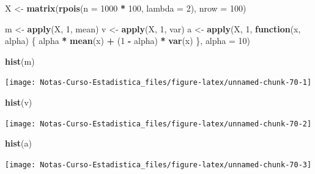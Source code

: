 \documentclass[
  12pt,
]{book}
\newenvironment{Shaded}{\begin{snugshade}}{\end{snugshade}}
\newcommand{\ControlFlowTok}[1]{\textcolor[rgb]{0.13,0.29,0.53}{\textbf{#1}}}
\newcommand{\DataTypeTok}[1]{\textcolor[rgb]{0.13,0.29,0.53}{#1}}
\newcommand{\DecValTok}[1]{\textcolor[rgb]{0.00,0.00,0.81}{#1}}
\newcommand{\KeywordTok}[1]{\textcolor[rgb]{0.13,0.29,0.53}{\textbf{#1}}}
\newcommand{\NormalTok}[1]{#1}
\newcommand{\OperatorTok}[1]{\textcolor[rgb]{0.81,0.36,0.00}{\textbf{#1}}}
\newcommand{\StringTok}[1]{\textcolor[rgb]{0.31,0.60,0.02}{#1}}
\begin{document}
\begin{Shaded}
\begin{Highlighting}[]
\NormalTok{X \textless{}{-}}\StringTok{ }\KeywordTok{matrix}\NormalTok{(}\KeywordTok{rpois}\NormalTok{(}\DataTypeTok{n =} \DecValTok{1000} \OperatorTok{*}\StringTok{ }\DecValTok{100}\NormalTok{, }\DataTypeTok{lambda =} \DecValTok{2}\NormalTok{), }\DataTypeTok{nrow =} \DecValTok{100}\NormalTok{)}

\NormalTok{m \textless{}{-}}\StringTok{ }\KeywordTok{apply}\NormalTok{(X, }\DecValTok{1}\NormalTok{, mean)}
\NormalTok{v \textless{}{-}}\StringTok{ }\KeywordTok{apply}\NormalTok{(X, }\DecValTok{1}\NormalTok{, var)}
\NormalTok{a \textless{}{-}}\StringTok{ }\KeywordTok{apply}\NormalTok{(X, }\DecValTok{1}\NormalTok{, }\ControlFlowTok{function}\NormalTok{(x, alpha) \{}
\NormalTok{    alpha }\OperatorTok{*}\StringTok{ }\KeywordTok{mean}\NormalTok{(x) }\OperatorTok{+}\StringTok{ }\NormalTok{(}\DecValTok{1} \OperatorTok{{-}}\StringTok{ }\NormalTok{alpha) }\OperatorTok{*}\StringTok{ }\KeywordTok{var}\NormalTok{(x)}
\NormalTok{\}, }\DataTypeTok{alpha =} \DecValTok{10}\NormalTok{)}

\KeywordTok{hist}\NormalTok{(m)}
\end{Highlighting}
\end{Shaded}

\begin{center}\texttt{[image: Notas-Curso-Estadistica\_files/figure-latex/unnamed-chunk-70-1]} \end{center}

\begin{Shaded}
\begin{Highlighting}[]
\KeywordTok{hist}\NormalTok{(v)}
\end{Highlighting}
\end{Shaded}

\begin{center}\texttt{[image: Notas-Curso-Estadistica\_files/figure-latex/unnamed-chunk-70-2]} \end{center}

\begin{Shaded}
\begin{Highlighting}[]
\KeywordTok{hist}\NormalTok{(a)}
\end{Highlighting}
\end{Shaded}

\begin{center}\texttt{[image: Notas-Curso-Estadistica\_files/figure-latex/unnamed-chunk-70-3]} \end{center}
\end{document}
